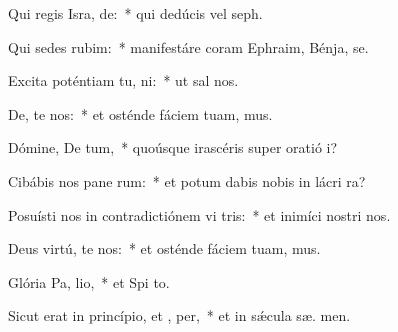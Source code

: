 \item Qui regis Isra, de:~* qui dedúcis vel  seph.
\item Qui sedes  rubim:~* manifestáre coram Ephraim, Bénja,  se.
\item Excita poténtiam tu,  ni:~* ut sal  nos.
\item De, te nos:~* et osténde fáciem tuam,   mus.
\item Dómine, De tum,~* quoúsque irascéris super oratió  i?
\item Cibábis nos pane rum:~* et potum dabis nobis in lácri  ra?
\item Posuísti nos in contradictiónem vi tris:~* et inimíci nostri  nos.
\item Deus virtú, te nos:~* et osténde fáciem tuam,   mus.
\item Glória Pa,  lio,~* et Spi to.
\item Sicut erat in princípio, et ,  per,~* et in sǽcula sæ. men.
